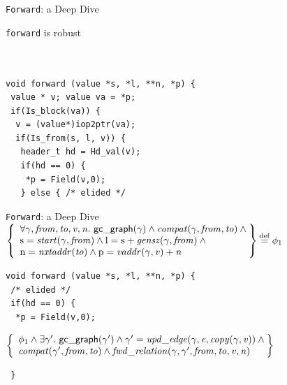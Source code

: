 \documentclass[usenames, xcolor=dvipsnames]{beamer}
\makeatletter
\newcommand{\defeq}{\mathbin{\overset{\mathrm{def}}{=}}}
\newcommand{\braces}[1]{\left\{\begin{array}{l@{}} #1 \end{array}\right\}}
\newcommand{\m}[1]{\ensuremath{\mathit{#1}}} %
\newcommand{\p}[1]{\ensuremath{\mathsf{#1}}} %
\makeatother
\begin{document}
\begin{frame}[fragile]{\texttt{Forward}: a Deep Dive}

\texttt{forward} is \alert{robust} 
\\ 
\\
\\

\bigskip

\begin{Verbatim}
void forward (value *s, *l, **n, *p) { 
 value * v; value va = *p;
 if(Is_block(va)) {
  v = (value*)iop2ptr(va);
  if(Is_from(s, l, v)) {
   header_t hd = Hd_val(v);
   if(hd == 0) {
    *p = Field(v,0);
   } else { /* elided */
\end{Verbatim}
\end{frame}

\newcommand{\ga}{\gamma}
\newcommand{\tx}[1]{\text{#1}}


\begin{frame}[fragile]{\texttt{Forward}: a Deep Dive}
$\braces{\forall \ga, \m{from}, \m{to}, \m{v}, \m{n}.~\p{gc{\_}graph}(\ga) \wedge \m{compat}(\ga, \m{from}, \m{to}) \wedge \null \\ \tx{s} = \m{start}(\ga, \m{from}) \wedge \tx{l} = \tx{s} + \m{gensz}(\ga, \m{from}) \wedge \null \\  \tx{n} = \m{nxtaddr}(\m{to}) \wedge \tx{p} = \m{vaddr}(\ga, \m{v}) + \m{n}} \defeq \phi_1$

\pause
\begin{Verbatim}
void forward (value *s, *l, **n, *p) { 
 /* elided */
 if(hd == 0) {
  *p = Field(v,0);
\end{Verbatim}
\pause
$\braces{\phi_{1} \wedge \exists \ga'.~\p{gc{\_}graph}(\ga') \wedge \ga' = \m{upd\_edge}(\ga, \m{e}, \m{copy}(\ga, \m{v})) \wedge \null \\ \m{compat}(\ga', \m{from}, \m{to}) \wedge \m{fwd\_relation}(\ga, \ga', \m{from}, \m{to}, \m{v}, \m{n})}$
\begin{Verbatim}
 }
\end{Verbatim}
\end{frame}
\end{document}
